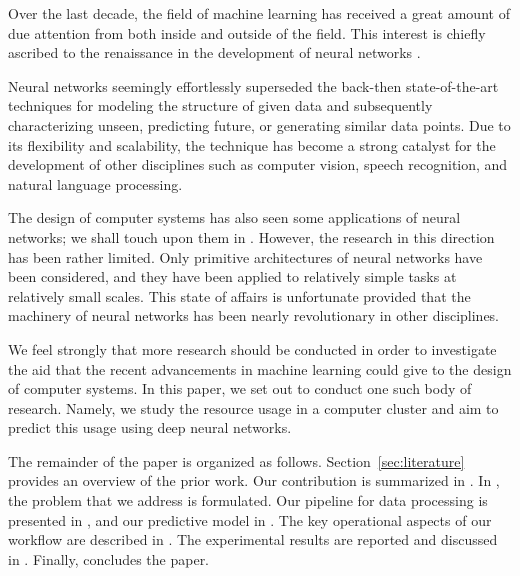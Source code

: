 Over the last decade, the field of machine learning has received a great amount
of due attention from both inside and outside of the field. This interest is
chiefly ascribed to the renaissance in the development of neural networks
\cite{goodfellow2016}.

Neural networks seemingly effortlessly superseded the back-then state-of-the-art
techniques for modeling the structure of given data and subsequently
characterizing unseen, predicting future, or generating similar data points. Due
to its flexibility and scalability, the technique has become a strong catalyst
for the development of other disciplines such as computer vision, speech
recognition, and natural language processing.

The design of computer systems has also seen some applications of neural
networks; we shall touch upon them in . However, the research
in this direction has been rather limited. Only primitive architectures of
neural networks have been considered, and they have been applied to relatively
simple tasks at relatively small scales. This state of affairs is unfortunate
provided that the machinery of neural networks has been nearly revolutionary in
other disciplines.

We feel strongly that more research should be conducted in order to investigate
the aid that the recent advancements in machine learning could give to the
design of computer systems. In this paper, we set out to conduct one such body
of research. Namely, we study the resource usage in a computer cluster and aim
to predict this usage using deep neural networks.

The remainder of the paper is organized as follows. Section~\ref{sec:literature}
provides an overview of the prior work. Our contribution is summarized in
. In , the problem that we address is
formulated. Our pipeline for data processing is presented in , and
our predictive model in . The key operational aspects of our
workflow are described in . The experimental results are
reported and discussed in . Finally,  concludes
the paper.
